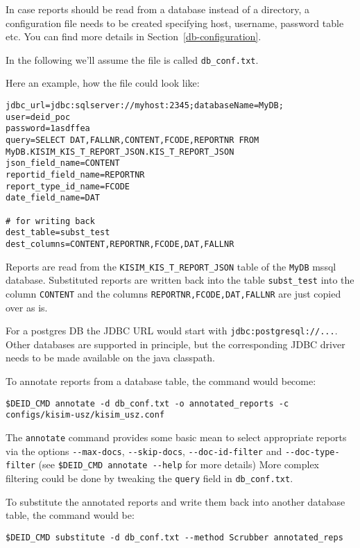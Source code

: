 In case reports should be read from a database instead of a directory, a
configuration file needs to be created specifying host, username,
password table etc. You can find more details in Section~\ref{db-configuration}.

In the following we'll assume the file is called \texttt{db\_conf.txt}.

Here an example, how the file could look like:

\begin{verbatim}
jdbc_url=jdbc:sqlserver://myhost:2345;databaseName=MyDB;
user=deid_poc
password=1asdffea
query=SELECT DAT,FALLNR,CONTENT,FCODE,REPORTNR FROM MyDB.KISIM_KIS_T_REPORT_JSON.KIS_T_REPORT_JSON
json_field_name=CONTENT
reportid_field_name=REPORTNR
report_type_id_name=FCODE
date_field_name=DAT

# for writing back
dest_table=subst_test
dest_columns=CONTENT,REPORTNR,FCODE,DAT,FALLNR
\end{verbatim}

Reports are read from the \texttt{KISIM\_KIS\_T\_REPORT\_JSON} table of
the \texttt{MyDB} mssql database. Substituted reports are written back
into the table \texttt{subst\_test} into the column \texttt{CONTENT} and
the columns \texttt{REPORTNR,FCODE,DAT,FALLNR} are just copied over as
is.

For a postgres DB the JDBC URL would start with
\texttt{jdbc:postgresql://...}. Other databases are supported in
principle, but the corresponding JDBC driver needs to be made available
on the java classpath.

To annotate reports from a database table, the command would become:

\begin{verbatim}
$DEID_CMD annotate -d db_conf.txt -o annotated_reports -c configs/kisim-usz/kisim_usz.conf
\end{verbatim}

The \texttt{annotate} command provides some basic mean to select
appropriate reports via the options \texttt{-\/-max-docs},
\texttt{-\/-skip-docs}, \texttt{-\/-doc-id-filter} and
\texttt{-\/-doc-type-filter} (see
\texttt{\$DEID\_CMD\ annotate\ -\/-help} for more details) More complex
filtering could be done by tweaking the \texttt{query} field in
\texttt{db\_conf.txt}.

To substitute the annotated reports and write them back into another
database table, the command would be:

\begin{verbatim}
$DEID_CMD substitute -d db_conf.txt --method Scrubber annotated_reps
\end{verbatim}

